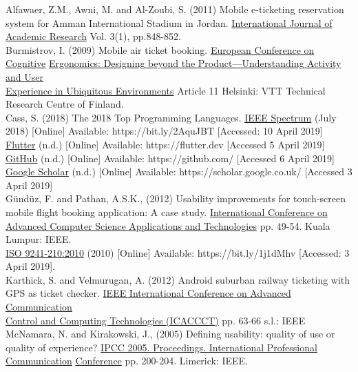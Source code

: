 \documentclass[version=last,fontsize=13pt]{scrartcl}
\begin{document}
Alfawaer, Z.M., Awni, M. and Al-Zoubi, S. (2011) Mobile e-ticketing reservation system for Amman International Stadium in Jordan. \underline{International Journal of Academic Research}  Vol. 3(1), pp.848-852.\\

Burmistrov, I. (2009) Mobile air ticket booking.  \underline{European Conference on Cognitive} \underline{Ergonomics: Designing beyond the Product}\underline{---Understanding Activity and User}\\ \underline{Experience in Ubiquitous Environments} Article 11 Helsinki: VTT Technical Research Centre of Finland.\\

Cass, S. (2018) The 2018 Top Programming Languages.  \underline{IEEE Spectrum} (July 2018) [Online] Available: https://bit.ly/2AquJBT [Accessed: 10 April 2019]\\

\underline{Flutter} (n.d.) [Online] Available: https://flutter.dev [Accessed 5 April 2019]\\

\underline{GitHub} (n.d.) [Online] Available: https://github.com/ [Accessed 6 April 2019]\\

\underline{Google Scholar} (n.d.) [Online] Available: https://scholar.google.co.uk/ [Accessed 3 April 2019]\\

Gündüz, F. and Pathan, A.S.K., (2012) Usability improvements for touch-screen mobile flight booking application: A case study.  \underline{International Conference on Advanced } \underline{Computer Science Applications and Technologies}  pp. 49-54. Kuala Lumpur: IEEE.\\

\underline{ISO 9241-210:2010} (2010) [Online] Available: https://bit.ly/1j1dMhv [Accessed: 3 April 2019].\\

Karthick, S. and Velmurugan, A. (2012) Android suburban railway ticketing with GPS as ticket checker.  \underline{IEEE International Conference on Advanced Communication }\\ \underline{Control and Computing Technologies (ICACCCT)} pp. 63-66  s.l.: IEEE\\

McNamara, N. and Kirakowski, J., (2005)  Defining usability: quality of use or quality of experience?  \underline{IPCC 2005. Proceedings. International Professional Communication} \underline{Conference} pp. 200-204. Limerick: IEEE.\\
\end{document}
